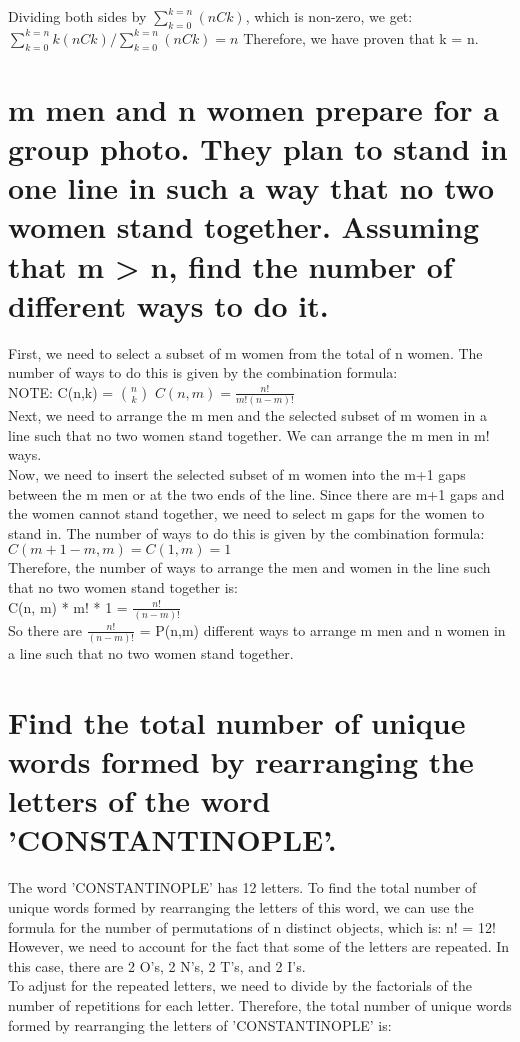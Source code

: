 \documentclass{article}
\begin{document}
Dividing both sides by $\sum_{k=0}^{k=n} (n C k)$, which is non-zero, we get:\\

$\sum_{k=0}^{k=n}k (n C k) / \sum_{k=0}^{k=n} (n C k) = n$
Therefore, we have proven that k = n.\\
\hline

\section{m men and n women prepare for a group photo. They plan to stand in one line in such a way
that no two women stand together. Assuming that m > n, find the number of different ways to
do it.}
First, we need to select a subset of m women from the total of n women. The number of ways to do this is given by the combination formula:\\
NOTE: C(n,k) = $n \choose k$
$C(n, m) = \frac{n!}{m!(n-m)!}$\\
Next, we need to arrange the m men and the selected subset of m women in a line such that no two women stand together. We can arrange the m men in m! ways.\\
Now, we need to insert the selected subset of m women into the m+1 gaps between the m men or at the two ends of the line. Since there are m+1 gaps and the women cannot stand together, we need to select m gaps for the women to stand in. The number of ways to do this is given by the combination formula:\\
$C(m+1-m, m) = C(1, m) = 1$\\
Therefore, the number of ways to arrange the men and women in the line such that no two women stand together is:\\
C(n, m) * m! * 1 = $\frac{n!}{(n-m)!}$\\

So there are $\frac{n!}{(n-m)!}$ = P(n,m) different ways to arrange m men and n women in a line such that no two women stand together.\\
\hline
\section{Find the total number of unique words formed by rearranging the letters of the word
'CONSTANTINOPLE'.}
The word 'CONSTANTINOPLE' has 12 letters. To find the total number of unique words formed by rearranging the letters of this word, we can use the formula for the number of permutations of n distinct objects, which is:
n! = 12!\\
However, we need to account for the fact that some of the letters are repeated. In this case, there are 2 O's, 2 N's, 2 T's, and 2 I's.\\
To adjust for the repeated letters, we need to divide by the factorials of the number of repetitions for each letter. Therefore, the total number of unique words formed by rearranging the letters of 'CONSTANTINOPLE' is:\\
\end{document}
